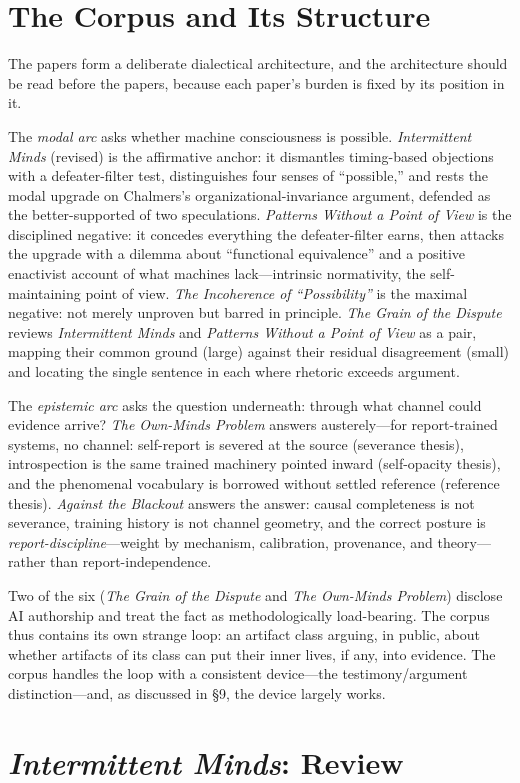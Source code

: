 \documentclass[11pt]{article}
\newcommand{\IM}{\emph{Intermittent Minds}}
\newcommand{\PP}{\emph{Patterns Without a Point of View}}
\newcommand{\IC}{\emph{The Incoherence of ``Possibility''}}
\newcommand{\GD}{\emph{The Grain of the Dispute}}
\newcommand{\OM}{\emph{The Own-Minds Problem}}
\newcommand{\AB}{\emph{Against the Blackout}}
\begin{document}
\section{The Corpus and Its Structure}

The papers form a deliberate dialectical architecture, and the architecture should be read before the papers, because each paper's burden is fixed by its position in it.

The \emph{modal arc} asks whether machine consciousness is possible. \IM{} (revised) is the affirmative anchor: it dismantles timing-based objections with a defeater-filter test, distinguishes four senses of ``possible,'' and rests the modal upgrade on Chalmers's organizational-invariance argument, defended as the better-supported of two speculations. \PP{} is the disciplined negative: it concedes everything the defeater-filter earns, then attacks the upgrade with a dilemma about ``functional equivalence'' and a positive enactivist account of what machines lack---intrinsic normativity, the self-maintaining point of view. \IC{} is the maximal negative: not merely unproven but barred in principle. \GD{} reviews \IM{} and \PP{} as a pair, mapping their common ground (large) against their residual disagreement (small) and locating the single sentence in each where rhetoric exceeds argument.

The \emph{epistemic arc} asks the question underneath: through what channel could evidence arrive? \OM{} answers austerely---for report-trained systems, no channel: self-report is severed at the source (severance thesis), introspection is the same trained machinery pointed inward (self-opacity thesis), and the phenomenal vocabulary is borrowed without settled reference (reference thesis). \AB{} answers the answer: causal completeness is not severance, training history is not channel geometry, and the correct posture is \emph{report-discipline}---weight by mechanism, calibration, provenance, and theory---rather than report-independence.

Two of the six (\GD{} and \OM{}) disclose AI authorship and treat the fact as methodologically load-bearing. The corpus thus contains its own strange loop: an artifact class arguing, in public, about whether artifacts of its class can put their inner lives, if any, into evidence. The corpus handles the loop with a consistent device---the testimony/argument distinction---and, as discussed in \S 9, the device largely works.

\section{\IM{}: Review}
\end{document}
